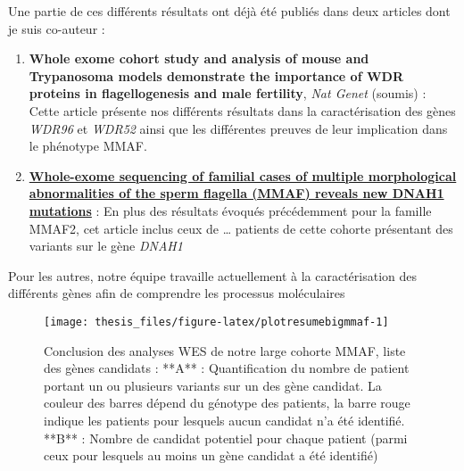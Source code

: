 \documentclass[12pt,twoside]{reedthesis}
\theoremstyle{definition}
\theoremstyle{definition}
\theoremstyle{remark}
\begin{document}
  Une partie de ces différents résultats ont déjà été publiés dans deux
  articles dont je suis co-auteur :
  
  \begin{enumerate}
  \def\labelenumi{\arabic{enumi}.}
  \item
    \textbf{Whole exome cohort study and analysis of mouse and Trypanosoma
    models demonstrate the importance of WDR proteins in flagellogenesis
    and male fertility}, \emph{Nat Genet} (soumis) : Cette article
    présente nos différents résultats dans la caractérisation des gènes
    \emph{WDR96} et \emph{WDR52} ainsi que les différentes preuves de leur
    implication dans le phénotype MMAF.
  \item
    \protect\hyperlink{famdnah1}{\textbf{Whole-exome sequencing of
    familial cases of multiple morphological abnormalities of the sperm
    flagella (MMAF) reveals new DNAH1 mutations}} : En plus des résultats
    évoqués précédemment pour la famille MMAF2, cet article inclus ceux de
    \ldots{} patients de cette cohorte présentant des variants sur le gène
    \emph{DNAH1}
  \end{enumerate}
  
  Pour les autres, notre équipe travaille actuellement à la
  caractérisation des différents gènes afin de comprendre les processus
  moléculaires
  
  \newpage
  
  \begin{figure}
  
  {\centering \texttt{[image: thesis\_files/figure-latex/plotresumebigmmaf-1]} 
  
  }
  
  \caption[Conclusion des analyses WES de notre large cohorte MMAF, liste des gènes candidats]{Conclusion des analyses WES de notre large cohorte MMAF, liste des gènes candidats : **A** : Quantification du nombre de patient portant un ou plusieurs variants sur un des gène candidat. La couleur des barres dépend du génotype des patients, la barre rouge indique les patients pour lesquels aucun candidat n'a été identifié. **B** : Nombre de candidat potentiel pour chaque patient (parmi ceux pour lesquels au moins un gène candidat a été identifié)}\label{fig:plotresumebigmmaf}
  \end{figure}
  
  \newpage
  
\end{document}
